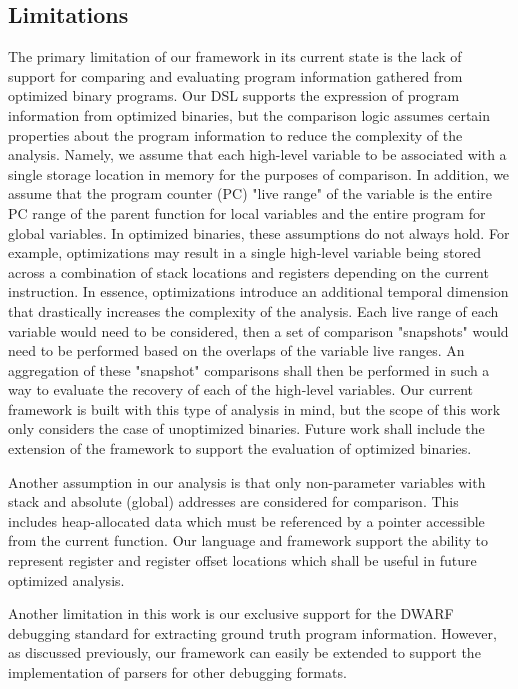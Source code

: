 \documentclass[conference]{IEEEtran}
\begin{document}
\subsection{Limitations}

The primary limitation of our framework in its current state is the lack of support for comparing and evaluating program information gathered from optimized binary programs. Our DSL supports the expression of program information from optimized binaries, but the comparison logic assumes certain properties about the program information to reduce the complexity of the analysis. Namely, we assume that each high-level variable to be associated with a single storage location in memory for the purposes of comparison. In addition, we assume that the program counter (PC) "live range" of the variable is the entire PC range of the parent function for local variables and the entire program for global variables. In optimized binaries, these assumptions do not always hold. For example, optimizations may result in a single high-level variable being stored across a combination of stack locations and registers depending on the current instruction. In essence, optimizations introduce an additional temporal dimension that drastically increases the complexity of the analysis. Each live range of each variable would need to be considered, then a set of comparison "snapshots" would need to be performed based on the overlaps of the variable live ranges. An aggregation of these "snapshot" comparisons shall then be performed in such a way to evaluate the recovery of each of the high-level variables. Our current framework is built with this type of analysis in mind, but the scope of this work only considers the case of unoptimized binaries. Future work shall include the extension of the framework to support the evaluation of optimized binaries.

Another assumption in our analysis is that only non-parameter variables with stack and absolute (global) addresses are considered for comparison. This includes heap-allocated data which must be referenced by a pointer accessible from the current function. Our language and framework support the ability to represent register and register offset locations which shall be useful in future optimized analysis.

Another limitation in this work is our exclusive support for the DWARF debugging standard for extracting ground truth program information. However, as discussed previously, our framework can easily be extended to support the implementation of parsers for other debugging formats.
\end{document}

